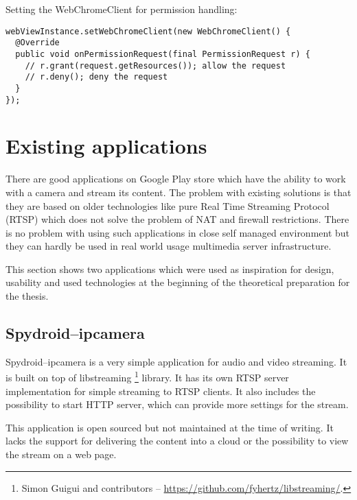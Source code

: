 \vspace{1em}
\noindent\vspace{-0.3em}\noindent
Setting the WebChromeClient for permission handling:
\begin{lstlisting}
webViewInstance.setWebChromeClient(new WebChromeClient() {
  @Override
  public void onPermissionRequest(final PermissionRequest r) {
    // r.grant(request.getResources()); allow the request
    // r.deny(); deny the request
  }
});
\end{lstlisting}





\section{Existing applications}
There are good applications on Google Play store which have the ability to work with a camera and stream its content. The problem with existing solutions is that they are based on older technologies like pure Real Time Streaming Protocol (RTSP) which does not solve the problem of NAT and firewall restrictions. There is no problem with using such applications in close self managed environment but they can hardly be used in real world usage multimedia server infrastructure.

This section shows two applications which were used as inspiration for design, usability and used technologies at the beginning of the theoretical preparation for the thesis. 

\subsection{Spydroid--ipcamera}
Spydroid--ipcamera is a very simple application for audio and video streaming. It is built on top of libstreaming \footnote{Simon Guigui and contributors -- \url{https://github.com/fyhertz/libstreaming/}.} library. It has its own RTSP server implementation for simple streaming to RTSP clients. It also includes the possibility to start  HTTP server, which can provide more settings for the stream.

This application is open sourced but not maintained at the time of writing. It lacks the support for delivering the content into a cloud or the possibility to view the stream on a web page.

